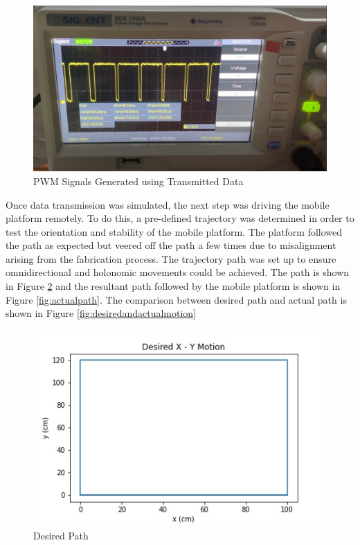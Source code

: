 \begin{figure}[H]
    \centering
    \includegraphics[scale = 0.4]{Figures/pwmResults.png}
    \caption{PWM Signals Generated using Transmitted Data}
    \label{fig:pwmResult}
\end{figure}

\par
Once data transmission was simulated, the next step was driving the mobile platform remotely. To do this, a pre-defined trajectory was determined in order to test the orientation and stability of the mobile platform. The platform followed the path as expected but veered off the path a few times due to misalignment arising from the fabrication process. The trajectory path was set up to ensure omnidirectional and holonomic movements could be achieved. The path is shown in Figure \ref{fig:desiredPath} and the resultant path followed by the mobile platform is shown in Figure \ref{fig:actualpath}. The comparison between desired path and actual path is shown in Figure \ref{fig:desiredandactualmotion}

\begin{figure}[H]
    \centering
    \includegraphics[scale = 0.8]{Figures/desiredmotion.jpeg}
    \caption{Desired Path}
    \label{fig:desiredPath}
\end{figure}

